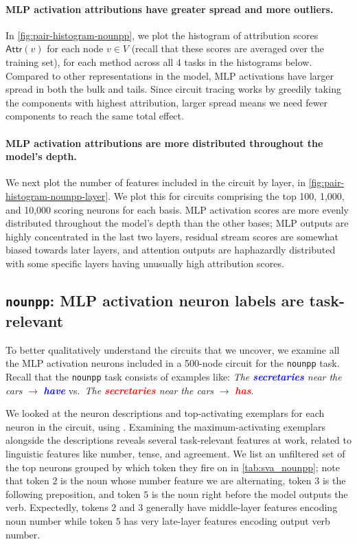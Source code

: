 \documentclass{article}
\theoremstyle{plain}
\theoremstyle{definition}
\theoremstyle{remark}
\begin{document}
\paragraph{MLP activation attributions have greater spread and more outliers.} In \cref{fig:pair-histogram-nounpp}, we plot the histogram of attribution scores $\mathsf{Attr}(v)$ for each node $v \in V$ (recall that these scores are averaged over the training set), for each method across all 4 tasks in the histograms below. Compared to other representations in the model, MLP activations have larger spread in both the bulk and tails. Since circuit tracing works by greedily taking the components with highest attribution, larger spread means we need fewer components to reach the same total effect.

\paragraph{MLP activation attributions are more distributed throughout the model's depth.} We next plot the number of features included in the circuit by layer, in \cref{fig:pair-histogram-nounpp-layer}. We
plot this for circuits comprising the top 100, 1,000, and 10,000 scoring neurons for each basis. MLP activation scores are more evenly distributed throughout the model's depth than the other bases; MLP outputs are highly concentrated in the last two layers, residual stream scores are somewhat biased towards later layers, and attention outputs are haphazardly distributed with some specific layers having unusually high attribution scores.

\newpage
\subsection{\texttt{nounpp}: MLP activation neuron labels are task-relevant}
To better qualitatively understand the circuits that we uncover, we examine all the MLP activation neurons
included in a 500-node circuit for the \texttt{nounpp} task.
Recall that the \texttt{nounpp} task consists of examples like: \textit{The \textcolor{blue}{\textbf{secretaries}} near the cars} $\to$ \textit{\textcolor{blue}{\textbf{have}}} vs.~\textit{The \textcolor{red}{\textbf{secretaries}} near the cars} $\to$ \textit{\textcolor{red}{\textbf{has}}}.

We looked at the neuron descriptions and top-activating exemplars for each neuron in the circuit,
using \citet{choi2024automatic}.
Examining the maximum-activating exemplars alongside the descriptions reveals several task-relevant features at work, related to linguistic features like number, tense, and agreement. We list an unfiltered set of the top neurons grouped by which token they fire on in \cref{tab:sva_nounpp}; note that token $2$ is the noun whose number feature we are alternating, token $3$ is the following preposition, and token $5$ is the noun right before the model outputs the verb. Expectedly, tokens $2$ and $3$ generally have middle-layer features encoding noun number while token $5$ has very late-layer features encoding output verb number.
\end{document}
